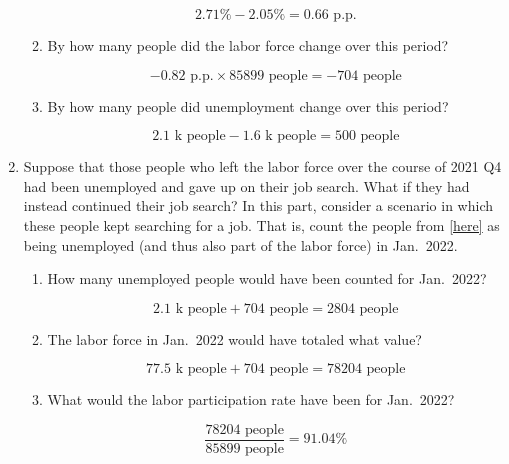 \documentclass{assignment}
\begin{document}
\begin{enumerate}
\begin{enumerate}
\begin{solution}
$$2.71\% - 2.05\% = 0.66 \text{~p.p.}$$
\end{solution}

\item By how many people did the labor force change over this period? \label{here}

\begin{solution}
$$-0.82 \text{~p.p.} \times 85899 \text{~people} = -704 \text{~people}$$
\end{solution}

\item By how many people did unemployment change over this period?

\begin{solution}
$$2.1 \text{~k people} - 1.6 \text{~k people} = 500 \text{~people}$$
\end{solution}

\end{enumerate}
\item Suppose that those people who left the labor force over the course of 2021 Q4 had been unemployed and gave up on their job search. What if they had instead continued their job search? In this part, consider a scenario in which these people kept searching for a job. That is, count the people from \cref{here} as being unemployed (and thus also part of the labor force) in Jan.~2022.

\begin{enumerate}
\item How many unemployed people would have been counted for Jan.~2022?

\begin{solution}
$$2.1 \text{~k people} + 704 \text{~people} = 2804 \text{~people}$$
\end{solution}

\item The labor force in Jan.~2022 would have totaled what value?

\begin{solution}
$$77.5 \text{~k people} + 704 \text{~people} = 78204 \text{~people}$$
\end{solution}

\item What would the labor participation rate have been for Jan.~2022?

\begin{solution}
$$\frac{78204 \text{~people}}{85899 \text{~people}} = 91.04\%$$
\end{solution}


\end{enumerate}
\end{enumerate}
\end{document}
